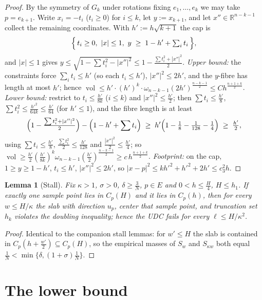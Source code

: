 ﻿\documentclass[11pt]{article}
\newtheorem{lemma}[theorem]{Lemma}
\newcommand{\R}{\mathbb{R}}
\newcommand{\vol}{\operatorname{vol}}
\begin{document}
\begin{proof}
By the symmetry of $G_k$ under rotations fixing $e_1,\dots,e_k$ we may take
$p=e_{k+1}$.  Write $x_i=-t_i$ ($t_i\ge0$) for $i\le k$, let
$y:=x_{k+1}$, and let $x''\in\R^{n-k-1}$ collect the remaining coordinates.
With $h':=h\sqrt{k+1}$ the cap is
\[
\Bigl\{\,t_i\ge0,\ |x|\le1,\ y\;\ge\;1-h'+\textstyle\sum_it_i\,\Bigr\},
\]
and $|x|\le1$ gives $y\le\sqrt{1-\sum t_i^2-|x''|^2}\le1-\frac{\sum
t_i^2+|x''|^2}2$.  \emph{Upper bound:} the constraints force
$\sum_it_i\le h'$ (so each $t_i\le h'$), $|x''|^2\le2h'$, and the
$y$-fibre has length at most $h'$; hence
$\vol\le h'\cdot(h')^k\cdot\omega_{n-k-1}(2h')^{\frac{n-k-1}2}
\le C h^{\frac{n+1+k}2}$.  \emph{Lower bound:} restrict to
$t_i\le\frac{h'}{8k}$ ($i\le k$) and $|x''|^2\le\frac{h'}2$; then
$\sum t_i\le\frac{h'}8$, $\sum t_i^2\le\frac{h'^2}{64k}\le\frac{h'}{64}$
(for $h'\le1$), and the fibre length is at least
\[
\Bigl(1-\tfrac{\sum t_i^2+|x''|^2}2\Bigr)-\Bigl(1-h'+\sum t_i\Bigr)
\;\ge\;h'\Bigl(1-\tfrac18-\tfrac1{128}-\tfrac14\Bigr)\;\ge\;\tfrac{h'}2,
\]
using $\sum t_i\le\frac{h'}8$, $\frac{\sum t_i^2}2\le\frac{h'}{128}$ and
$\frac{|x''|^2}2\le\frac{h'}4$; so
$\vol\ge\frac{h'}2(\frac{h'}{8k})^k\omega_{n-k-1}(\frac{h'}2)^{\frac{n-k-1}2}
\ge c\,h^{\frac{n+1+k}2}$.  \emph{Footprint:} on the cap,
$1\ge y\ge1-h'$, $t_i\le h'$, $|x''|^2\le2h'$, so
$|x-p|^2\le kh'^2+h'^2+2h'\le c_3^2h$.
\end{proof}

\begin{lemma}[Stall]\label{lem:stall}
Fix $\kappa>1$, $\sigma>0$, $\delta\ge\frac3N$, $p\in E$ and
$0<h\le\frac H4$, $H\le h_1$.  If exactly one sample point lies in
$C_p(H)$ and it lies in $C_p(h)$, then for every $w\le H/\kappa$ the slab
with direction $u_p$, center that sample point, and truncation set $h_k$
violates the doubling inequality; hence the UDC fails for every
$\ell\le H/\kappa^2$.
\end{lemma}

\begin{proof}
Identical to the companion stall lemmas: for $w'\le H$ the slab is contained
in $C_p(h+\frac{w'}2)\subseteq C_p(H)$, so the empirical masses of $S_w$ and
$S_{\kappa w}$ both equal $\frac1N<\min\{\delta,(1+\sigma)\frac1N\}$.
\end{proof}

\section{The lower bound}\label{sec:lower}
\end{document}

